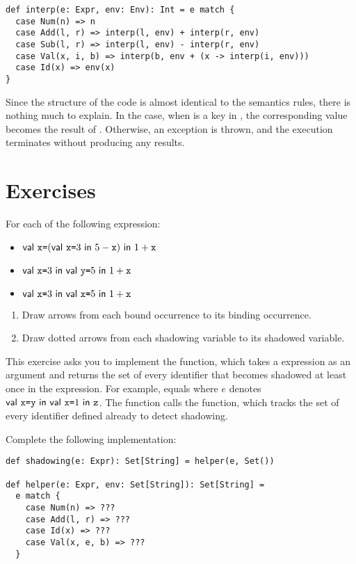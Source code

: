 \begin{verbatim}
def interp(e: Expr, env: Env): Int = e match {
  case Num(n) => n
  case Add(l, r) => interp(l, env) + interp(r, env)
  case Sub(l, r) => interp(l, env) - interp(r, env)
  case Val(x, i, b) => interp(b, env + (x -> interp(i, env)))
  case Id(x) => env(x)
}
\end{verbatim}

Since the structure of the code is almost identical to the semantics rules, there
is nothing much to explain. In the  case, when  is a key in
, the corresponding value becomes the result of .
Otherwise, an exception is thrown, and the execution
terminates without producing any results.

\section{Exercises}

\begin{exercise}

For each of the following expression:
\begin{itemize}
  \item $\textsf{val}\ \texttt{x}\texttt{=}(\textsf{val}\ \texttt{x}\texttt{=}3\ \textsf{in}\ 5-\texttt{x})\ \textsf{in}\ 1+\texttt{x}$
  \item $\textsf{val}\ \texttt{x}\texttt{=}3\ \textsf{in}\ \textsf{val}\ \texttt{y}\texttt{=}5\ \textsf{in}\ 1+\texttt{x}$
  \item $\textsf{val}\ \texttt{x}\texttt{=}3\ \textsf{in}\ \textsf{val}\ \texttt{x}\texttt{=}5\ \textsf{in}\ 1+\texttt{x}$
\end{itemize}
\begin{enumerate}
  \item Draw arrows from each bound occurrence to its binding occurrence.
  \item Draw dotted arrows from each shadowing variable to its shadowed variable.
\end{enumerate}

\end{exercise}

\begin{exercise}

This exercise asks you to implement the  function, which
takes a \Lang expression as an argument and returns the set of every
identifier that becomes shadowed at least once in the expression. For
example,  equals  where $e$ denotes
$\textsf{val}\ \texttt{x}\texttt{=}\texttt{y}\ \textsf{in}\ \textsf{val}\ \texttt{x}\texttt{=}1\ \textsf{in}\ \texttt{z}$.  The  function
calls the  function, which tracks the set of every identifier
defined already to detect shadowing.

Complete the following implementation:

\begin{verbatim}
def shadowing(e: Expr): Set[String] = helper(e, Set())

def helper(e: Expr, env: Set[String]): Set[String] =
  e match {
    case Num(n) => ???
    case Add(l, r) => ???
    case Id(x) => ???
    case Val(x, e, b) => ???
  }
\end{verbatim}

\end{exercise}

